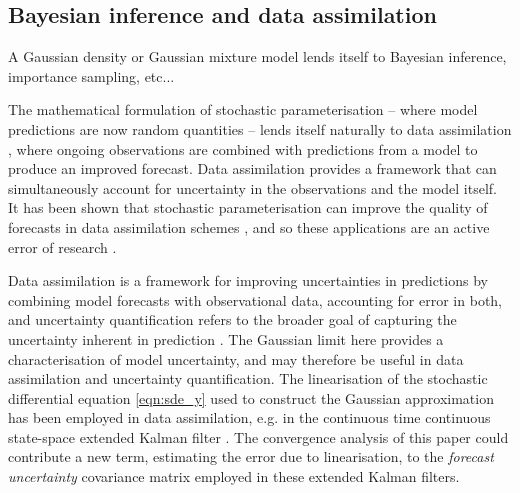 \subsection{Bayesian inference and data assimilation}
A Gaussian density or Gaussian mixture model lends itself to Bayesian inference, importance sampling, etc...

The mathematical formulation of stochastic parameterisation -- where model predictions are now random quantities -- lends itself naturally to data assimilation \citep{BudhirajaEtAl_2019_AssimilatingDataModels,Jazwinski_2014_StochasticProcessesFiltering,LawEtAl_2015_DataAssimilationMathematical,ReichCotter_2015_ProbabilisticForecastingBayesian}, where ongoing observations are combined with predictions from a model to produce an improved forecast.
Data assimilation provides a framework that can simultaneously account for uncertainty in the observations and the model itself.
It has been shown that stochastic parameterisation can improve the quality of forecasts in data assimilation schemes \citep{MitchellGottwald_2012_DataAssimilationSlow,HaEtAl_2015_ComparisonModelError}, and so these applications are an active error of research \citep[e.g.]{GottwaldHarlim_2013_RoleAdditiveMultiplicative}.

Data assimilation is a framework for improving uncertainties in predictions by combining model forecasts with observational data, accounting for error in both, and uncertainty quantification refers to the broader goal of capturing the uncertainty inherent in prediction \citep{BudhirajaEtAl_2019_AssimilatingDataModels,Jazwinski_2014_StochasticProcessesFiltering,LawEtAl_2015_DataAssimilationMathematical,ReichCotter_2015_ProbabilisticForecastingBayesian}.
The Gaussian limit here provides a characterisation of model uncertainty, and may therefore be useful in data assimilation and uncertainty quantification.
The linearisation of the stochastic differential equation \cref{eqn:sde_y} used to construct the Gaussian approximation has been employed in data assimilation, e.g. in the continuous time continuous state-space extended Kalman filter \citep[\S 9]{Jazwinski_2014_StochasticProcessesFiltering}.
The convergence analysis of this paper could contribute a new term, estimating the error due to linearisation, to the \emph{forecast uncertainty} covariance matrix employed in these extended Kalman filters.

